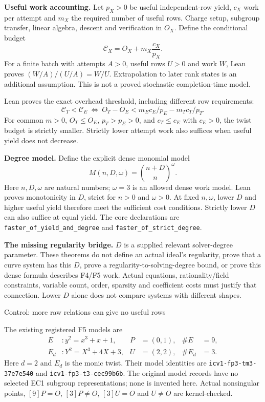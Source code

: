 \documentclass[10pt]{article}
\begin{document}
\textbf{Useful work accounting.} Let $p_X>0$ be useful independent-row yield,
$c_X$ work per attempt and $m_X$ the required number of useful rows. Charge
setup, subgroup transfer, linear algebra, descent and verification in $O_X$.
Define the conditional budget
\[
\mathcal C_X=O_X+m_X\frac{c_X}{p_X}.
\]
For a finite batch with attempts $A>0$, useful rows $U>0$ and work $W$, Lean
proves $(W/A)/(U/A)=W/U$. Extrapolation to later rank states is an additional
assumption. This is not a proved stochastic completion-time model.

Lean proves the exact overhead threshold, including different row requirements:
\[
\boxed{\mathcal C_T<\mathcal C_E\ \Longleftrightarrow\
O_T-O_E<m_Ec_E/p_E-m_Tc_T/p_T.}
\]
For common $m>0$, $O_T\le O_E$, $p_T>p_E>0$, and $c_T\le c_E$ with $c_E>0$,
the twist budget is strictly smaller. Strictly lower attempt work also suffices
when useful yield does not decrease.

\textbf{Degree model.} Define the explicit dense monomial model
\[
M(n,D,\omega)=\binom{n+D}{n}^{\omega}.
\]
Here $n,D,\omega$ are natural numbers; $\omega=3$ is an allowed dense work model.
Lean proves monotonicity in $D$, strict for $n>0$ and $\omega>0$.
At fixed $n,\omega$, lower $D$ and higher useful yield therefore meet the
sufficient cost conditions. Strictly lower $D$ can also suffice at equal yield.
The core declarations are \texttt{faster\_of\_yield\_and\_degree} and
\texttt{faster\_of\_strict\_degree}.

\textbf{The missing regularity bridge.} $D$ is a supplied relevant solver-degree
parameter. These theorems do not define an actual ideal's regularity, prove that
a curve system has this $D$, prove a regularity-to-solving-degree bound, or prove
this dense formula describes F4/F5 work. Actual equations, rationality/field
constraints, variable count, order, sparsity and coefficient costs must justify
that connection. Lower $D$ alone does not compare systems with different shapes.

\newpage
\begin{center}{\Large Control: more raw relations can give no useful rows}\end{center}
The existing registered F5 models are
\begin{align*}
E &: y^2=x^3+x+1, &P&=(0,1), &\#E&=9,\\
E_d &: Y^2=X^3+4X+3, &U&=(2,2), &\#E_d&=3.
\end{align*}
Here $d=2$ and $E_d$ is the monic twist. Their model identities are
\texttt{icv1-fp3-tm3-37e7e540} and \texttt{icv1-fp3-t3-cec99b6b}.
The original model records have no selected EC1 subgroup representations;
none is invented here. Actual nonsingular points, $[9]P=O$, $[3]P\ne O$,
$[3]U=O$ and $U\ne O$ are kernel-checked.
\end{document}
